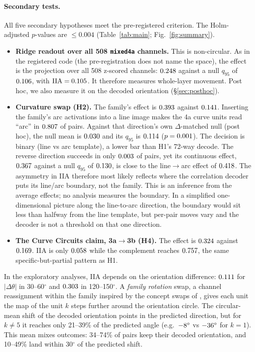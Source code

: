 \documentclass[11pt]{article}
\newcommand{\iia}{\mathrm{IIA}}
\begin{document}
\paragraph{Secondary tests.}
All five secondary hypotheses meet the pre-registered criterion. The Holm-adjusted $p$-values are $\le0.004$ (Table~\ref{tab:main}; Fig.~\ref{fig:summary}).
\begin{itemize}
\item \textbf{Ridge readout over all 508 \texttt{mixed4a} channels.} This is non-circular. As in the registered code (the pre-registration does not name the space), the effect is the projection over all 508 z-scored channels: $0.248$ against a null $q_{95}$ of $0.106$, with $\iia=\HRidgeIIA$. It therefore measures whole-layer movement. Post hoc, we also measure it on the decoded orientation (\S\ref{sec:posthoc}).
\item \textbf{Curvature swap (H2).} The family's effect is $0.393$ against $0.141$. Inserting the family's arc activations into a line image makes the 4a curve units read ``arc'' in $0.807$ of pairs. Against that direction's own $\Delta$-matched null (post hoc), the null mean is $0.030$ and its $q_{95}$ is $0.114$ ($p=0.001$). The decision is binary (line vs arc template), a lower bar than H1's 72-way decode. The reverse direction succeeds in only $0.003$ of pairs, yet its continuous effect, $0.367$ against a null $q_{95}$ of $0.130$, is close to the line$\to$arc effect of $0.418$. The asymmetry in IIA therefore most likely reflects where the correlation decoder puts its line/arc boundary, not the family. This is an inference from the average effects; no analysis measures the boundary. In a simplified one-dimensional picture along the line-to-arc direction, the boundary would sit less than halfway from the line template, but per-pair moves vary and the decoder is not a threshold on that one direction.
\item \textbf{The Curve Circuits claim, 3a$\to$3b (H4).} The effect is $0.324$ against $0.169$. IIA is only $0.058$ while the complement reaches $0.757$, the same specific-but-partial pattern as H1.
\end{itemize}
In the exploratory analyses, IIA depends on the orientation difference: $0.111$ for $|\Delta\theta|$ in 30--60$^\circ$ and $0.303$ in 120--150$^\circ$. A \emph{family rotation} swap, a channel reassignment within the family inspired by the concept swaps of \citet{gurnee2026workspace}, gives each unit the map of the unit $k$ steps further around the orientation circle. The circular-mean shift of the decoded orientation points in the predicted direction, but for $k\neq5$ it reaches only 21--39\% of the predicted angle (e.g.\ $-8^\circ$ vs $-36^\circ$ for $k=1$). This mean mixes outcomes: 34--74\% of pairs keep their decoded orientation, and 10--49\% land within 30$^\circ$ of the predicted shift.
\end{document}
